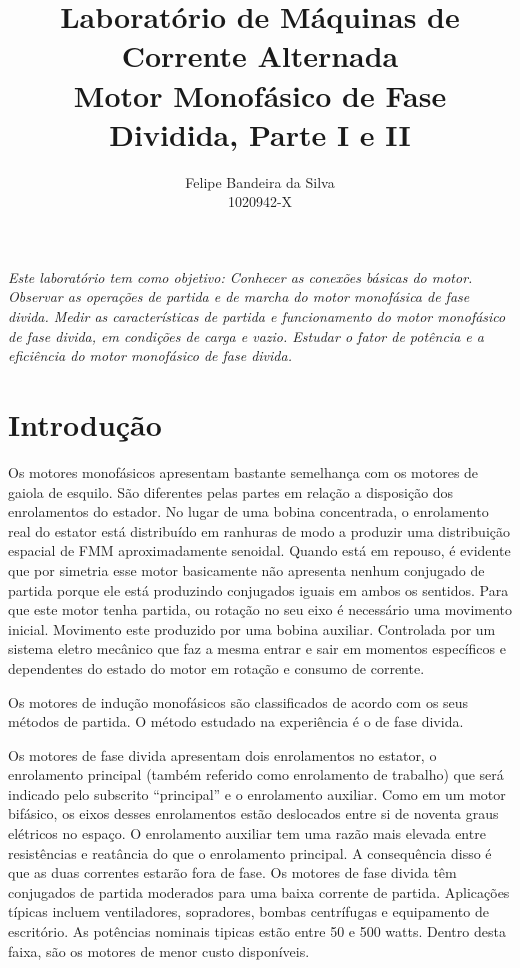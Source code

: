 \documentclass[paper=a4, fontsize=11pt]{article}
\title{Laboratório de Máquinas de Corrente Alternada\\Motor Monofásico de Fase Dividida, Parte I e II}
\author{Felipe Bandeira da Silva\\1020942-X}
\begin{document}
\maketitle


\textit{Este laboratório tem como objetivo: Conhecer as conexões básicas do motor.
Observar as operações de partida e de marcha do motor monofásica de fase divida.
Medir as características de partida e funcionamento do motor monofásico de fase
divida, em condições de carga e vazio. Estudar o fator de potência e a eficiência 
do motor monofásico de fase divida.}

\newpage

\tableofcontents

\newpage



\newpage
\section{Introdução}

Os motores monofásicos apresentam bastante semelhança com os motores
de gaiola de esquilo. São diferentes pelas partes em relação a 
disposição dos enrolamentos do estador. No lugar de uma bobina
concentrada, o enrolamento real do estator está distribuído em 
ranhuras de modo a produzir uma distribuição espacial de FMM 
aproximadamente senoidal. Quando está em repouso, é evidente que
por simetria esse motor basicamente não apresenta nenhum conjugado
de partida porque ele está produzindo conjugados iguais em ambos
os sentidos. Para que este motor tenha partida, ou rotação no seu
eixo é necessário uma movimento inicial. Movimento este produzido
por uma bobina auxiliar. Controlada por um sistema eletro mecânico
que faz a mesma entrar e sair em momentos específicos e dependentes
do estado do motor em rotação e consumo de corrente.

Os motores de indução monofásicos são classificados de acordo 
com os seus métodos de partida. O método estudado na experiência
é o de fase divida. 

Os motores de fase divida apresentam dois enrolamentos no estator, 
o enrolamento principal (também referido como enrolamento de trabalho)
que será indicado pelo subscrito ``principal'' e o enrolamento auxiliar.
Como em um motor bifásico, os eixos desses enrolamentos estão deslocados
entre si de noventa graus elétricos no espaço. O enrolamento auxiliar
tem uma razão mais elevada entre resistências e reatância do que 
o enrolamento principal. A consequência disso é que as duas correntes
estarão fora de fase. Os motores de fase divida têm conjugados de partida
moderados para uma baixa corrente de partida. Aplicações típicas incluem
ventiladores, sopradores, bombas centrífugas e equipamento de escritório. 
As potências nominais tipicas estão entre 50 e 500 watts. Dentro desta
faixa, são os motores de menor custo disponíveis.
\end{document}
